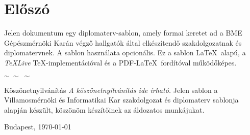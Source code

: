 

\selecthungarian

\chapter*{Előszó}

Jelen dokumentum egy diplomaterv-sablon, amely formai keretet ad a BME Gépészmérnöki Karán végző hallgatók által elkészítendő szakdolgozatnak és diplomatervnek. A sablon használata opcionális. Ez a sablon \LaTeX~alapú, a \emph{TeXLive} \TeX-implementációval és a PDF-\LaTeX~fordítóval működőképes.

\begin{center}
    $\sim \: \sim \: \sim$
\end{center}

\begin{flushleft}
Köszönetnyilvánítás \emph{A köszönetnyilvánítás ide írható.} Jelen sablon a Villamosmérnöki és Informatikai Kar szakdolgozat és diplomaterv sablonja alapján készült, köszönöm készítőinek az áldozatos munkájukat.
\end{flushleft}

\vspace{0.5cm}

\begin{flushleft}
{Budapest, \today}
\end{flushleft}

\begin{flushright}
\emph{\szerzo}
\end{flushright}

\vfill